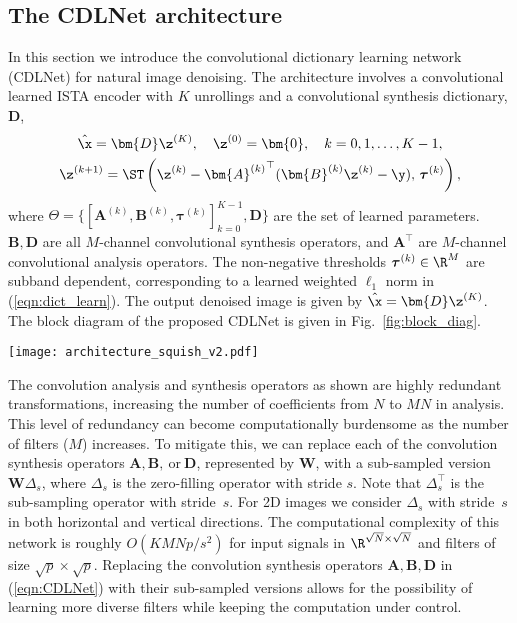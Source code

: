\documentclass[conference]{IEEEtran}
\begin{document}
\subsection{The CDLNet architecture} \label{sec:prop_arch}
In this section we introduce the convolutional dictionary learning network (CDLNet) for natural image denoising. The architecture involves a convolutional learned ISTA encoder with $K$ unrollings and a convolutional synthesis dictionary, $\bm{D}$,
\begin{gather} \label{eqn:CDLNet}
\hat{\x} = \bm{D}\z^{(K)}, \quad \z^{(0)} = \bm{0}, \quad k=0,1,\dots, K-1,\\
\z^{(k+1)} = \ST\left(\z^{(k)} - {\bm{A}^{(k)}}^\top (\bm{B}^{(k)}\z^{(k)} - \y), \, \boldsymbol{\tau}^{(k)} \right), \nonumber
\end{gather}
where $\Theta = \{[\bm{A}^{(k)}, \bm{B}^{(k)}, \boldsymbol{\tau}^{(k)}]_{k=0}^{K-1}, \bm{D}\}$ are the set of learned parameters. $\bm{B}, \bm{D}$ are all $M$-channel convolutional synthesis operators, and $\bm{A}^\top$ are $M$-channel convolutional analysis operators. The non-negative thresholds $\boldsymbol{\tau}^{(k)} \in \R^M$ are  subband dependent, corresponding to a learned weighted $\ell_1$ norm in (\ref{eqn:dict_learn}). The output denoised image is given by $\hat{\x} = \bm{D}\z^{(K)}$. The block diagram of the proposed CDLNet is given in Fig.~\ref{fig:block_diag}.

\begin{figure*}[t]
    \centering
    \texttt{[image: architecture\_squish\_v2.pdf]}
    \caption{Block diagram of CDLNet. Analysis and synthesis convolutions map from $1$ to $M$ and $M$ to $1$ channels, respectively. We say that CDLNet does not process signals in a ``learned feature domain" to differentiate from the usage of multi-channel filtering ($M$ to $M$ channels) in DNNs such as DnCNN \cite{DnCNN}. Also note that CDLNet does not use batch-normalization or residual learning, in contrast to DnCNN \cite{DnCNN}.}
    \label{fig:block_diag}
\end{figure*}

The convolution analysis and synthesis operators as shown are highly redundant transformations, increasing the number of coefficients from $N$ to $MN$ in analysis. This level of redundancy can become computationally burdensome as the number of filters ($M$) increases. To mitigate this, we can replace each of the convolution synthesis operators $\bm{A},\bm{B},~\text{or}~\bm{D}$, represented by $\bm{W}$, with a sub-sampled version $\bm{W}\Delta_s$, where $\Delta_s$ is the zero-filling operator with stride $s$. Note that $\Delta_s^\top$ is the sub-sampling operator with stride~$s$. For 2D images we consider $\Delta_s$ with stride~$s$ in both horizontal and vertical directions. The computational complexity of this network is roughly $O(KMNp/s^2)$ for input signals in $\R^{\sqrt{N}\times\sqrt{N}}$ and filters of size $\sqrt{p}\times\sqrt{p}$. Replacing the convolution synthesis operators $\bm{A},\bm{B},\bm{D}$  in (\ref{eqn:CDLNet}) with their sub-sampled versions allows for the possibility of learning more diverse filters while keeping the computation under control. 
\end{document}
